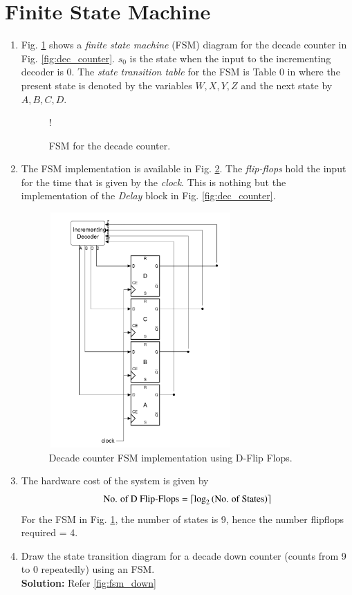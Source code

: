 \documentclass[journal,12pt,twocolumn]{IEEEtran}
\begin{document}
\section{Finite State Machine}
%
\begin{enumerate}[1.]

\item Fig. \ref{fig:fsm_counter} shows a {\em finite state machine} (FSM) diagram for the decade counter in Fig. \ref{fig:dec_counter}.  $s_0$ is the state when the input to the incrementing decoder is 0.  The {\em state transition table} for the FSM is Table 0 in \cite{gvv_kmap} where the present state is denoted by the variables $W,X,Y,Z$ and the next state by $A,B,C,D$.  
\begin{figure}[!h]
	
	\centering
	\resizebox {\columnwidth} {!} {
		
		}
	\caption{FSM for the decade counter.}
	\label{fig:fsm_counter}
\end{figure}
\item The FSM implementation is available in Fig. \ref{fig:dff}.  The {\em flip-flops} hold the input for the time that is given by the {\em clock}.  This is nothing but the implementation of the {\em Delay} block in Fig. \ref{fig:dec_counter}.
%
\begin{figure}[!h]
	\begin{center}
	\includegraphics[width=7cm,height=9cm]{./fsm}
\end{center}
	\caption{Decade counter FSM implementation using D-Flip Flops.}
	\label{fig:dff}
\end{figure}
%
\item The hardware cost of the system is given by
\begin{equation}
	\text{No. of D Flip-Flops} = \left \lceil \log_{2}\left(\text{No. of States}\right) \right \rceil
\end{equation}
For the FSM in Fig. \ref{fig:fsm_counter}, the number of states is 9, hence the number flipflops required = 4.  
\item Draw the state transition diagram for 
a decade down counter (counts from 9 to 0 repeatedly) using an FSM.  \\
\textbf{Solution:} Refer \ref{fig:fsm_down}\\
\begin{figure}
	


\end{figure}
\end{enumerate}
\end{document}
